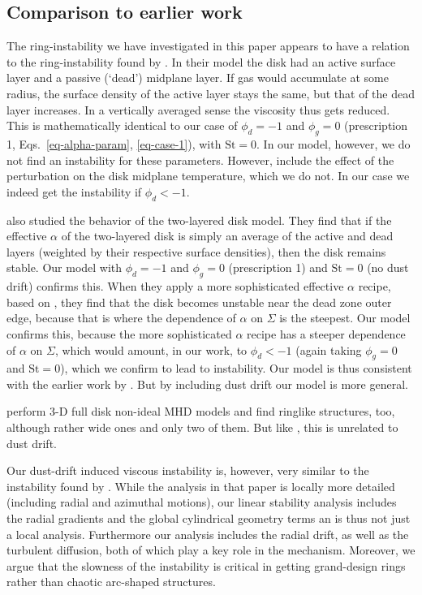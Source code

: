 \documentclass{aa}
\newcommand{\revised}[1]{{#1}}
\begin{document}
\subsection{Comparison to earlier work}
The ring-instability we have investigated in this paper appears to have a
relation to the ring-instability found by \citet{2005MNRAS.362..361W}. In their
model the disk had an active surface layer and a passive (`dead') midplane
layer. If gas would accumulate at some radius, the surface density of the active
layer stays the same, but that of the dead layer increases. In a vertically
averaged sense the viscosity thus gets reduced. This is mathematically identical
to our case of $\phi_d=-1$ and $\phi_g=0$ (prescription 1,
Eqs.~\ref{eq-alpha-param}, \ref{eq-case-1}), with $\mathrm{St}=0$. In our model,
however, we do not find an instability for these parameters. However,
\citet{2005MNRAS.362..361W} include the effect of the perturbation on the disk
midplane temperature, which we do not. In our case we indeed get the instability
if $\phi_d<-1$.

\revised{\citet{2015ApJ...815...99H} also studied the behavior of the
  two-layered disk model. They find that if the effective $\alpha$ of the
  two-layered disk is simply an average of the active and dead layers (weighted
  by their respective surface densities), then the disk remains stable. Our
  model with $\phi_d=-1$ and $\phi_g=0$ (prescription 1) and $\mathrm{St}=0$ (no
  dust drift) confirms this. When they apply a more sophisticated effective
  $\alpha$ recipe, based on \citet{2011ApJ...742...65O}, they find that the disk
  becomes unstable near the dead zone outer edge, because that is where the
  dependence of $\alpha$ on $\Sigma$ is the steepest. Our model confirms this,
  because the more sophisticated $\alpha$ recipe has a steeper dependence of
  $\alpha$ on $\Sigma$, which would amount, in our work, to $\phi_d<-1$ (again
  taking $\phi_g=0$ and $\mathrm{St}=0$), which we confirm to lead to
  instability. Our model is thus consistent with the earlier work by
  \citet{2015ApJ...815...99H}.  But by including dust drift our model is more
  general.}

\revised{\citet{2015A&A...574A..68F} perform 3-D full disk non-ideal MHD models
  and find ringlike structures, too, although rather wide ones and only two of
  them. But like \citet{2015ApJ...815...99H}, this is unrelated to dust drift.}

\revised{Our dust-drift induced viscous instability is, however, very similar to
  the instability found by \cite{2011IAUS..274...50J}. While the analysis in
  that paper is locally more detailed (including radial and azimuthal motions),
  our linear stability analysis includes the radial gradients and the global
  cylindrical geometry terms an is thus not just a local analysis. Furthermore
  our analysis includes the radial drift, as well as the turbulent diffusion,
  both of which play a key role in the mechanism. Moreover, we argue that the
  slowness of the instability is critical in getting grand-design rings
  rather than chaotic arc-shaped structures.}
\end{document}
